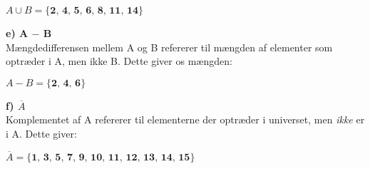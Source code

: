 \documentclass{article}
\begin{document}
\begin{center}
    \(A \cup B = \textbf{\{2, 4, 5, 6, 8, 11, 14\}}\)
\end{center}
\textbf{e) A \( - \) B}\\
Mængdedifferensen mellem A og B refererer til mængden af elementer som optræder i A, men ikke B. Dette giver os mængden:
\begin{center}
    \(A - B = \textbf{\{2, 4, 6\}}\)
\end{center}
\textbf{f) \(\overline{A}\)} \\
Komplementet af A refererer til elementerne der optræder i universet, men \textit{ikke} er i A. Dette giver:
\begin{center}
    \(\overline{A} = \textbf{\{1, 3, 5, 7, 9, 10, 11, 12, 13, 14, 15\}}\)
\end{center}
\\
\\



\end{document}
